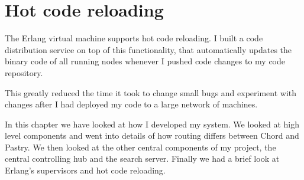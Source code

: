\section{Hot code reloading}
The Erlang virtual machine supports hot code reloading.
I built a code distribution service on top of this functionality, that automatically updates the binary code of all running nodes whenever I pushed code changes to my code repository.

This greatly reduced the time it took to change small bugs and experiment with changes after I had deployed my code to a large network of machines.

\mbox{}

In this chapter we have looked at how I developed my system. We looked at high level components and went into details of how routing differs between Chord and Pastry. We then looked at the other central components of my project, the central controlling hub and the search server.
Finally we had a brief look at Erlang's supervisors and hot code reloading.
